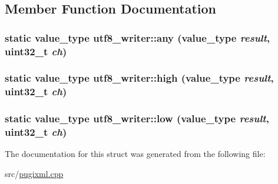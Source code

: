 \subsection{Member Function Documentation}
\hypertarget{structutf8__writer_a288e9c5f3720b95ae6b77330ad38dd56}{
\subsubsection[{any}]{\setlength{\rightskip}{0pt plus 5cm}static {\bf value\_\-type} utf8\_\-writer::any ({\bf value\_\-type} {\em result}, \/  uint32\_\-t {\em ch})}}
\label{structutf8__writer_a288e9c5f3720b95ae6b77330ad38dd56}
\hypertarget{structutf8__writer_ac03dfaf797d599afdf0be7def86ff9b9}{
\subsubsection[{high}]{\setlength{\rightskip}{0pt plus 5cm}static {\bf value\_\-type} utf8\_\-writer::high ({\bf value\_\-type} {\em result}, \/  uint32\_\-t {\em ch})}}
\label{structutf8__writer_ac03dfaf797d599afdf0be7def86ff9b9}
\hypertarget{structutf8__writer_ac4ec52da6f37225ba4fde259bff2f86c}{
\subsubsection[{low}]{\setlength{\rightskip}{0pt plus 5cm}static {\bf value\_\-type} utf8\_\-writer::low ({\bf value\_\-type} {\em result}, \/  uint32\_\-t {\em ch})}}
\label{structutf8__writer_ac4ec52da6f37225ba4fde259bff2f86c}


The documentation for this struct was generated from the following file:\begin{DoxyCompactItemize}
\item 
src/\hyperlink{pugixml_8cpp}{pugixml.cpp}\end{DoxyCompactItemize}
